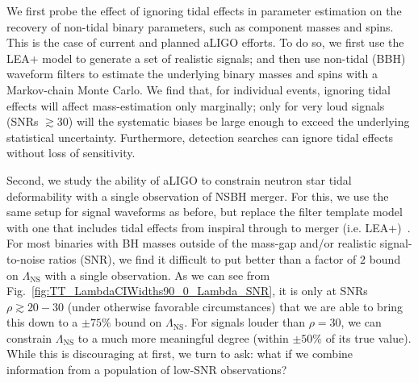\documentclass[aps,prd,amsmath,floats,floatfix, twocolumn,
superscriptaddress,nofootinbib,showpacs]{revtex4-1}
\newcommand{\red}{\textcolor{red}}
\newcommand{\prayush}{\textcolor{red!40!black}}
\newcommand{\lambdans}{\Lambda_\mathrm{NS}}
\begin{document}
We first probe the effect of ignoring tidal effects in parameter 
estimation on the recovery of non-tidal binary parameters, such as 
component masses and spins. This is the case of current and planned aLIGO
efforts.
To do so, we first use the LEA+ model to generate a set of realistic signals;
and then use non-tidal (BBH) waveform filters to estimate the underlying
binary masses and spins with a Markov-chain Monte Carlo.
% 
We find that, for individual events, ignoring tidal effects will affect
mass-estimation only marginally; only for very loud signals (SNRs $\gtrsim 30$)
will the systematic biases be large enough to exceed the underlying
statistical uncertainty. Furthermore, detection searches can ignore tidal
effects without loss of sensitivity.



Second, we study the ability of aLIGO to constrain neutron star tidal 
deformability with a single observation of NSBH merger. For this, we
use the same setup for signal waveforms as before, but replace the filter
template model with one that includes tidal effects from inspiral
through to merger (i.e. LEA+)~\cite{Lackey:2013axa}. For most binaries with
BH masses outside of the mass-gap and/or realistic signal-to-noise
ratios (SNR), we find it difficult to put better than a factor of $2$ bound
on $\lambdans$ with a single observation. As we can see from
Fig.~\ref{fig:TT_LambdaCIWidths90_0_Lambda_SNR}, it is only at SNRs 
$\rho\gtrsim 20-30$ (under otherwise favorable circumstances) that we are able
to bring this down to a $\pm 75\%$ bound on $\lambdans$. For signals louder
than $\rho =30$, we can constrain $\lambdans$ to a much more meaningful degree
(within $\pm 50\%$ of its true value).
While this is discouraging at first, we turn to ask: what if we combine
information from a population of low-SNR observations?
\end{document}
